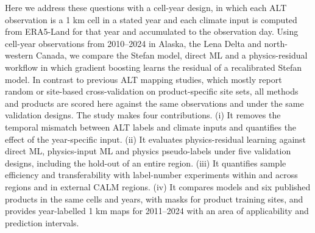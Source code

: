 Here we address these questions with a cell-year design, in which each ALT observation is a 1 km cell in a stated year and each climate input is computed from ERA5-Land for that year and accumulated to the observation day\cite{munozsabater2021_era5_land}. Using \nncyAll{} cell-year observations from 2010--2024 in Alaska, the Lena Delta and north-western Canada, we compare the Stefan model, direct ML and a physics-residual workflow in which gradient boosting learns the residual of a recalibrated Stefan model. In contrast to previous ALT mapping studies, which mostly report random or site-based cross-validation on product-specific site sets\cite{Liu2024,Wei2026,Ran2022a}, all methods and products are scored here against the same observations and under the same validation designs. The study makes four contributions. (i) It removes the temporal mismatch between ALT labels and climate inputs and quantifies the effect of the year-specific input. (ii) It evaluates physics-residual learning against direct ML, physics-input ML and physics pseudo-labels under five validation designs, including the hold-out of an entire region. (iii) It quantifies sample efficiency and transferability with label-number experiments within and across regions and in external CALM regions. (iv) It compares models and six published products in the same cells and years, with masks for product training sites, and provides year-labelled 1 km maps for 2011--2024 with an area of applicability and prediction intervals.
